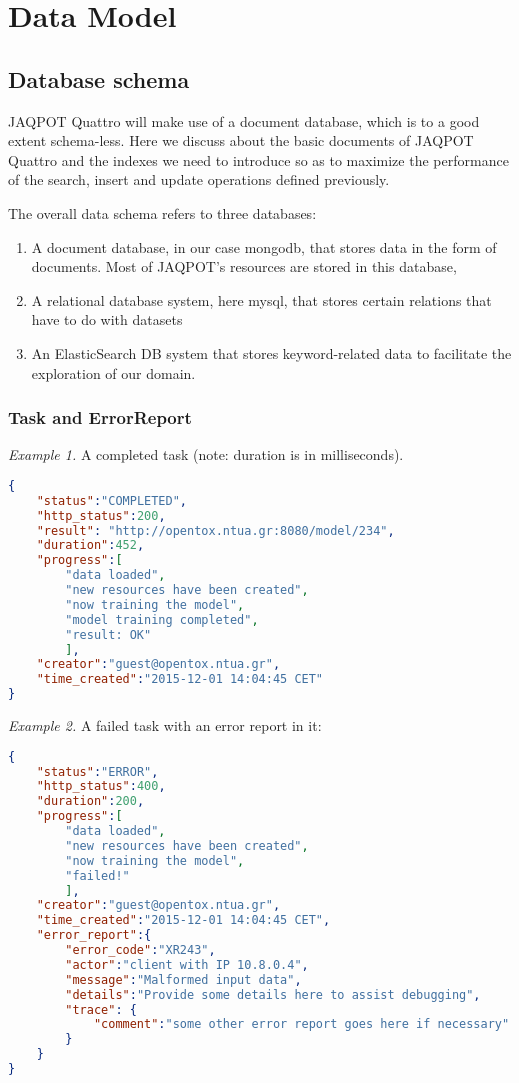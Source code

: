 \chapter{Data Model}




\section{Database schema}
JAQPOT Quattro will make use of a document database, 
which is to a good extent schema-less. Here we discuss about 
the basic documents of JAQPOT Quattro and the indexes we need to 
introduce so as to maximize the performance of the 
search, insert and update operations defined previously.

The overall data schema refers to three databases:

\begin{enumerate}
 \item  A document database, in our case mongodb, that stores data in the form of documents. Most of JAQPOT’s resources are stored in this database,
\item  A relational database system, here mysql, that stores certain relations that have to do with datasets
\item  An ElasticSearch DB system that stores keyword-related data to facilitate the exploration of our domain.
\end{enumerate}

\subsection{Task and ErrorReport}

\textit{Example 1.} A completed task (note: duration is in milliseconds).

\begin{lstlisting}[language=json]
{ 
    "status":"COMPLETED", 
    "http_status":200, 
    "result": "http://opentox.ntua.gr:8080/model/234", 
    "duration":452, 
    "progress":[ 
        "data loaded", 
        "new resources have been created", 
        "now training the model", 
        "model training completed", 
        "result: OK" 
        ], 
    "creator":"guest@opentox.ntua.gr", 
    "time_created":"2015-12-01 14:04:45 CET" 
} 
\end{lstlisting}

\noindent \textit{Example 2.} A failed task with an error report in it:
\begin{lstlisting}[language=json]
{ 
    "status":"ERROR", 
    "http_status":400, 
    "duration":200, 
    "progress":[ 
        "data loaded", 
        "new resources have been created", 
        "now training the model", 
        "failed!" 
        ], 
    "creator":"guest@opentox.ntua.gr", 
    "time_created":"2015-12-01 14:04:45 CET", 
    "error_report":{ 
        "error_code":"XR243", 
        "actor":"client with IP 10.8.0.4", 
        "message":"Malformed input data", 
        "details":"Provide some details here to assist debugging", 
        "trace": { 
            "comment":"some other error report goes here if necessary" 
        } 
    } 
} 
\end{lstlisting}

